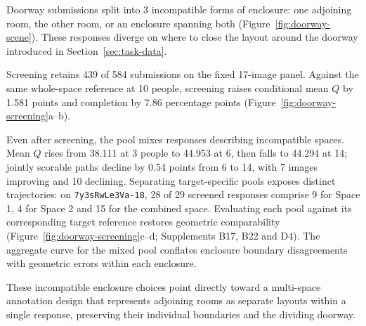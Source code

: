 Doorway submissions split into 3 incompatible forms of enclosure: one adjoining room, the other room, or an enclosure spanning both (Figure~\ref{fig:doorway-scene}). These responses diverge on where to close the layout around the doorway introduced in Section~\ref{sec:task-data}.

Screening retains 439 of 584 submissions on the fixed 17-image panel. Against the same whole-space reference at 10 people, screening raises conditional mean $Q$ by 1.581 points and completion by 7.86 percentage points (Figure~\ref{fig:doorway-screening}a--b).

Even after screening, the pool mixes responses describing incompatible spaces. Mean $Q$ rises from 38.111 at 3 people to 44.953 at 6, then falls to 44.294 at 14; jointly scorable paths decline by 0.54 points from 6 to 14, with 7 images improving and 10 declining. Separating target-specific pools exposes distinct trajectories: on \texttt{7y3sRwLe3Va-18}, 28 of 29 screened responses comprise 9 for Space 1, 4 for Space 2 and 15 for the combined space. Evaluating each pool against its corresponding target reference restores geometric comparability (Figure~\ref{fig:doorway-screening}c--d; Supplements B17, B22 and D4). The aggregate curve for the mixed pool conflates enclosure boundary disagreements with geometric errors within each enclosure.

These incompatible enclosure choices point directly toward a multi-space annotation design that represents adjoining rooms as separate layouts within a single response, preserving their individual boundaries and the dividing doorway.

